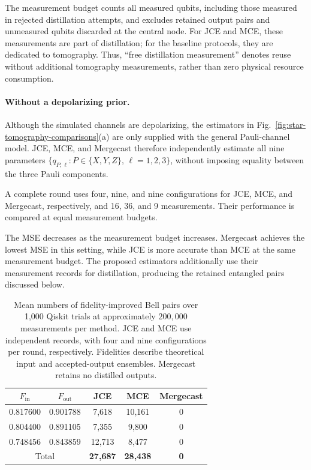 The measurement budget counts all measured qubits, including
those measured in rejected distillation attempts, and excludes
retained output pairs and unmeasured qubits discarded at
the central node.
For JCE and MCE, these measurements are part of distillation;
for the baseline protocols, they are dedicated to tomography.
Thus, ``free distillation measurement'' denotes reuse without
additional tomography measurements, rather than zero
physical resource consumption.

\paragraph{Without a depolarizing prior.}
Although the simulated channels are depolarizing, the estimators  in Fig.~\ref{fig:star-tomography-comparisons}(a)
are only supplied with the general Pauli-channel model.
JCE, MCE, and Mergecast therefore independently
estimate all nine parameters
$\{q_{P,\ell}:P\in\{X,Y,Z\},\,\ell=1,2,3\}$,
without imposing equality between the three Pauli components.

A complete round uses four, nine, and nine configurations for
JCE, MCE, and Mergecast, respectively, and 
16, 36, and 9 measurements.
Their performance is compared at equal measurement budgets.



The MSE decreases as the measurement budget increases.
Mergecast achieves the lowest MSE in this setting, while
JCE is more accurate than MCE at the same measurement budget.
The proposed estimators additionally use their measurement
records for distillation, producing the retained entangled
pairs discussed below.
\begin{table}
\centering
\caption{Mean numbers of fidelity-improved Bell pairs over 1,000 Qiskit trials at  approximately $200,000$ measurements per method. JCE and MCE use independent records, with four and nine configurations per round, respectively. Fidelities describe theoretical input and accepted-output ensembles. Mergecast retains no distilled outputs.}
\label{tab:three-methods-mean-retained-pairs}
\small
\setlength{\tabcolsep}{4pt}
\begin{tabular}{ccccc}
\toprule
$F_{\mathrm{in}}$ & $F_{\mathrm{out}}$ & JCE & MCE & Mergecast \\
\midrule
0.817600 & 0.901788 & 7,618 & 10,161 & 0 \\
0.804400 & 0.891105 & 7,355 & 9,800 & 0 \\
0.748456 & 0.843859 & 12,713 & 8,477 & 0 \\
\midrule
\multicolumn{2}{c}{Total} & \textbf{27,687} & \textbf{28,438} & \textbf{0} \\
\bottomrule
\end{tabular}
\end{table}

